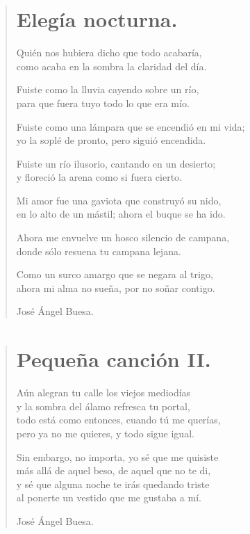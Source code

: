 \documentclass[11pt, portrait, twoside, notitlepage, openright]{book}
\begin{document}
\newpage
\begin{verse}
\begin{center}
\section{Elegía nocturna.}
\end{center}
Quién nos hubiera dicho que todo acabaría,\\
como acaba en la sombra la claridad del día.
\newline

Fuiste como la lluvia cayendo sobre un río,\\
para que fuera tuyo todo lo que era mío.
\newline

Fuiste como una lámpara que se encendió en mi vida;\\
yo la soplé de pronto, pero siguió encendida.
\newline

Fuiste un río ilusorio, cantando en un desierto;\\
y floreció la arena como si fuera cierto.
\newline

Mi amor fue una gaviota que construyó su nido,\\
en lo alto de un mástil; ahora el buque se ha ido.
\newline

Ahora me envuelve un hosco silencio de campana,\\
donde sólo resuena tu campana lejana.
\newline

Como un surco amargo que se negara al trigo,\\
ahora mi alma no sueña, por no soñar contigo.
\newline

José Ángel Buesa.
\end{verse}

\newpage
\begin{verse}
\begin{center}
\section{Pequeña canción II.}
\end{center}
Aún alegran tu calle los viejos mediodías\\
y la sombra del álamo refresca tu portal,\\
todo está como entonces, cuando tú me querías,\\
pero ya no me quieres, y todo sigue igual.
\newline

Sin embargo, no importa, yo sé que me quisiste\\
más allá de aquel beso, de aquel que no te di,\\
y sé que alguna noche te irás quedando triste\\
al ponerte un vestido que me gustaba a mí.
\newline

José Ángel Buesa.
\end{verse}
\end{document}
